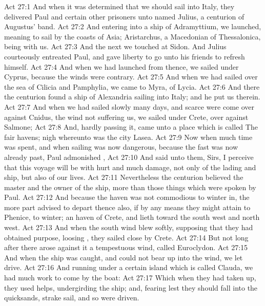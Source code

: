 \vs Act 27:1 And when it was determined that we should sail into Italy, they delivered Paul and certain other prisoners unto  named Julius, a centurion of Augustus' band.
\vs Act 27:2 And entering into a ship of Adramyttium, we launched, meaning to sail by the coasts of Asia;  Aristarchus, a Macedonian of Thessalonica, being with us.
\vs Act 27:3 And the next  we touched at Sidon. And Julius courteously entreated Paul, and gave  liberty to go unto his friends to refresh himself.
\vs Act 27:4 And when we had launched from thence, we sailed under Cyprus, because the winds were contrary.
\vs Act 27:5 And when we had sailed over the sea of Cilicia and Pamphylia, we came to Myra,  of Lycia.
\vs Act 27:6 And there the centurion found a ship of Alexandria sailing into Italy; and he put us therein.
\vs Act 27:7 And when we had sailed slowly many days, and scarce were come over against Cnidus, the wind not suffering us, we sailed under Crete, over against Salmone;
\vs Act 27:8 And, hardly passing it, came unto a place which is called The fair havens; nigh whereunto was the city  Lasea.
\vs Act 27:9 Now when much time was spent, and when sailing was now dangerous, because the fast was now already past, Paul admonished ,
\vs Act 27:10 And said unto them, Sirs, I perceive that this voyage will be with hurt and much damage, not only of the lading and ship, but also of our lives.
\vs Act 27:11 Nevertheless the centurion believed the master and the owner of the ship, more than those things which were spoken by Paul.
\vs Act 27:12 And because the haven was not commodious to winter in, the more part advised to depart thence also, if by any means they might attain to Phenice,  to winter;  an haven of Crete, and lieth toward the south west and north west.
\vs Act 27:13 And when the south wind blew softly, supposing that they had obtained  purpose, loosing , they sailed close by Crete.
\vs Act 27:14 But not long after there arose against it a tempestuous wind, called Euroclydon.
\vs Act 27:15 And when the ship was caught, and could not bear up into the wind, we let  drive.
\vs Act 27:16 And running under a certain island which is called Clauda, we had much work to come by the boat:
\vs Act 27:17 Which when they had taken up, they used helps, undergirding the ship; and, fearing lest they should fall into the quicksands, strake sail, and so were driven.
